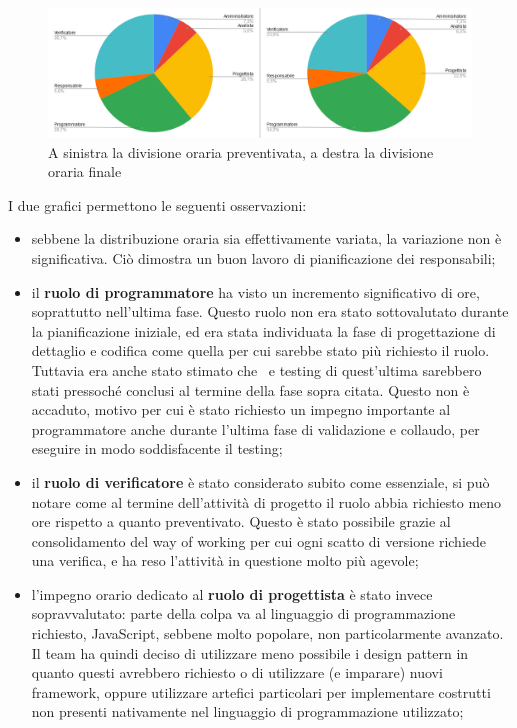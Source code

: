         \begin{figure}[H]
            \centering
            \includegraphics[width=\textwidth]{source/img/confronto_divisione_oraria.png}
            \caption{A sinistra la divisione oraria preventivata, a destra la divisione oraria finale}
        \end{figure}
        I due grafici permettono le seguenti osservazioni:
        \begin{itemize}
            \item sebbene la distribuzione oraria sia effettivamente variata, la variazione non è significativa. Ciò dimostra un buon lavoro di pianificazione dei responsabili;
            \item il \textbf{ruolo di programmatore} ha visto un incremento significativo di ore, soprattutto nell'ultima fase. Questo ruolo non era stato sottovalutato durante la pianificazione iniziale, ed era stata individuata la fase di progettazione di dettaglio e codifica come quella per cui sarebbe stato più richiesto il ruolo. Tuttavia era anche stato stimato che \hd\ e testing di quest'ultima sarebbero stati pressoché conclusi al termine della fase sopra citata. Questo non è accaduto, motivo per cui è stato richiesto un impegno importante al programmatore anche durante l'ultima fase di validazione e collaudo, per eseguire in modo soddisfacente il testing;
            \item il \textbf{ruolo di verificatore} è stato considerato subito come essenziale, si può notare come al termine dell'attività di progetto il ruolo abbia richiesto meno ore rispetto a quanto preventivato. Questo è stato possibile grazie al consolidamento del way of working per cui ogni scatto di versione richiede una verifica, e ha reso l'attività in questione molto più agevole;
            \item l'impegno orario dedicato al \textbf{ruolo di progettista} è stato invece sopravvalutato: parte della colpa va al linguaggio di programmazione richiesto, JavaScript, sebbene molto popolare, non particolarmente avanzato. Il team ha quindi deciso di utilizzare meno possibile i design pattern in quanto questi avrebbero richiesto o di utilizzare (e imparare) nuovi framework, oppure utilizzare artefici particolari per implementare costrutti non presenti nativamente nel linguaggio di programmazione utilizzato;

\end{itemize}
